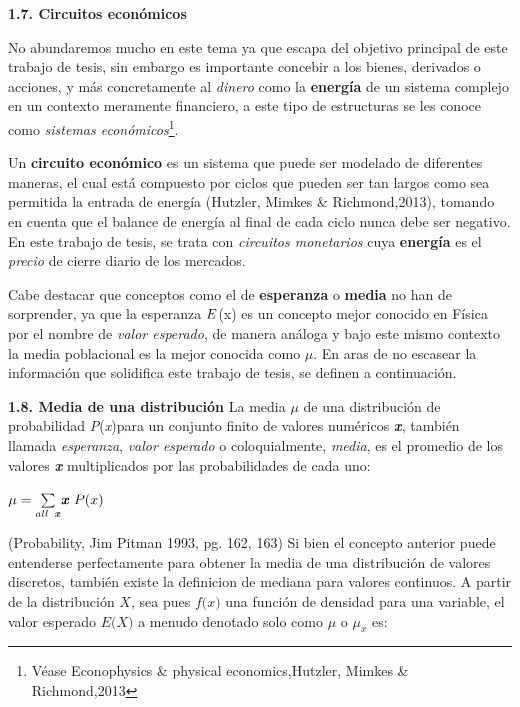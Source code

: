 {
\Large  \textbf{1.7. Circuitos económicos} 
}

No abundaremos mucho en este tema ya que escapa del objetivo principal de este trabajo de tesis, sin embargo es importante concebir a los bienes, derivados o acciones, y más concretamente al \textit{dinero} como la \textbf{energía} de un sistema complejo en un contexto meramente financiero, a este tipo de estructuras se les conoce como \textit{sistemas económicos}\footnote{Véase Econophysics \& physical economics,Hutzler, Mimkes \& Richmond,2013 }. 
\newline

Un \textbf{circuito económico} es un sistema que puede ser modelado de diferentes maneras, el cual está compuesto por ciclos que pueden ser tan largos como sea permitida la entrada de energía (Hutzler, Mimkes \& Richmond,2013), tomando en cuenta que el balance de energía al final de cada ciclo nunca debe ser negativo. En este trabajo de tesis, se trata con \textit{circuitos monetarios} cuya \textbf{energía} es el \textit{precio} de cierre diario de los mercados.
\newline

Cabe destacar que conceptos como el de \textbf{esperanza} o  \textbf{media} no han de sorprender, ya que la esperanza $\boldmath{E}$(x) es un concepto mejor conocido en Física por el nombre de \textit{valor esperado}, de manera análoga y bajo este mismo contexto la media poblacional es la mejor conocida como $\mu$. En aras de no escasear la información que solidifica este trabajo de tesis, se definen a continuación.

{
\Large  \textbf{1.8. Media de una distribución} 
}
\newline
La media $\mu$ de una distribución de probabilidad \textit{P}(\textit{x})para un conjunto finito de valores numéricos \textbf{\textit{x}}, también llamada \textit{esperanza}, \textit{valor esperado} o coloquialmente, \textit{media}, es el promedio de los valores \textbf{\textit{x}} multiplicados por las probabilidades de cada uno: 

\begin{center}
$\mu = \underset{all \hspace{0.15cm} \textbf{\textit{x}}}{\overset{}{\sum}} \textbf{\textit{x}} \hspace{0.11cm} P (x) $
\end{center}
(Probability, Jim Pitman 1993, pg. 162, 163)
\newpage
Si bien el concepto anterior puede entenderse perfectamente para obtener la media de una distribución de valores discretos, también existe la definicion de mediana para valores continuos. A partir de la distribución $\textit{X}$, sea pues $\textit{f(x)}$ una función de densidad para una variable, el valor esperado $\textit{E(X)}$ a menudo denotado solo como $\mu$ o $ \mu_x$ es:

